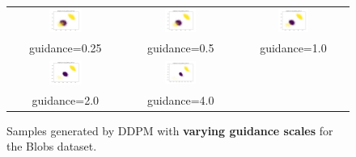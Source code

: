 \documentclass[11pt]{article}
\begin{document}
\begin{figure}[H]
    \centering
    \begin{tabular}{ccc}
        \includegraphics[width=0.3\textwidth]{exps/ddpm_2_150_0.0001_0.02_blobs/samples_cfg_150_0.25.png} &
        \includegraphics[width=0.3\textwidth]{exps/ddpm_2_150_0.0001_0.02_blobs/samples_cfg_150_0.5.png} &
        \includegraphics[width=0.3\textwidth]{exps/ddpm_2_150_0.0001_0.02_blobs/samples_cfg_150_1.0.png} \\
        guidance=0.25 & guidance=0.5 & guidance=1.0 \\ [0.5em]

        \includegraphics[width=0.3\textwidth]{exps/ddpm_2_150_0.0001_0.02_blobs/samples_cfg_150_2.0.png} &
        \includegraphics[width=0.3\textwidth]{exps/ddpm_2_150_0.0001_0.02_blobs/samples_cfg_150_4.0.png} & \\
        guidance=2.0 & guidance=4.0 & \\
    \end{tabular}
    \caption{Samples generated by DDPM with \textbf{varying guidance scales} for the Blobs dataset.}
    \label{fig:guidance_blobs}
\end{figure}
\end{document}
